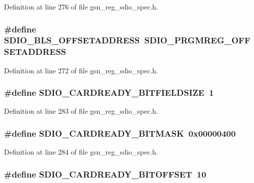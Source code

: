 Definition at line 276 of file gsn\_\-reg\_\-sdio\_\-spec.h.

\hypertarget{a00571_ab96da3bb7a07bdd265461fc06507bb66}{
\subsubsection[{SDIO\_\-BLS\_\-OFFSETADDRESS}]{\setlength{\rightskip}{0pt plus 5cm}\#define SDIO\_\-BLS\_\-OFFSETADDRESS~SDIO\_\-PRGMREG\_\-OFFSETADDRESS}}
\label{a00571_ab96da3bb7a07bdd265461fc06507bb66}


Definition at line 272 of file gsn\_\-reg\_\-sdio\_\-spec.h.

\hypertarget{a00571_aae3e9f86daee85c3e5d5129410b5fe9f}{
\subsubsection[{SDIO\_\-CARDREADY\_\-BITFIELDSIZE}]{\setlength{\rightskip}{0pt plus 5cm}\#define SDIO\_\-CARDREADY\_\-BITFIELDSIZE~1}}
\label{a00571_aae3e9f86daee85c3e5d5129410b5fe9f}


Definition at line 283 of file gsn\_\-reg\_\-sdio\_\-spec.h.

\hypertarget{a00571_aa01ee624972ec55212ce57ee0b569e68}{
\subsubsection[{SDIO\_\-CARDREADY\_\-BITMASK}]{\setlength{\rightskip}{0pt plus 5cm}\#define SDIO\_\-CARDREADY\_\-BITMASK~0x00000400}}
\label{a00571_aa01ee624972ec55212ce57ee0b569e68}


Definition at line 284 of file gsn\_\-reg\_\-sdio\_\-spec.h.

\hypertarget{a00571_a1e4fe5b932e04906f08a44f11de35274}{
\subsubsection[{SDIO\_\-CARDREADY\_\-BITOFFSET}]{\setlength{\rightskip}{0pt plus 5cm}\#define SDIO\_\-CARDREADY\_\-BITOFFSET~10}}
\label{a00571_a1e4fe5b932e04906f08a44f11de35274}


